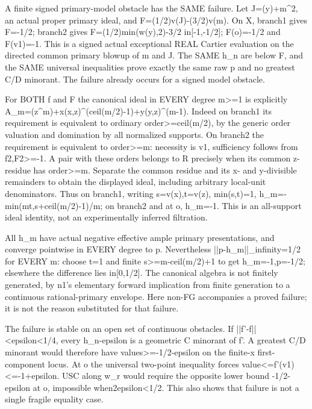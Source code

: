 A finite signed primary-model obstacle has the SAME failure. Let J=(y)+m\textasciicircum{}2, an actual proper primary ideal, and F=(1/2)v(J)-(3/2)v(m). On X, branch1 gives F=-1/2; branch2 gives F=(1/2)min(w(y),2)-3/2 in[-1,-1/2]; F(o)=-1/2 and F(v1)=-1. This is a signed actual exceptional REAL Cartier evaluation on the directed common primary blowup of m and J. The SAME h\_n are below F, and the SAME universal inequalities prove exactly the same raw p and no greatest C/D minorant. The failure already occurs for a signed model obstacle.

For BOTH f and F the canonical ideal in EVERY degree m\textgreater{}=1 is explicitly
A\_m=(z\textasciicircum{}m)+x(x,z)\textasciicircum{}(ceil(m/2)-1)+y(y,z)\textasciicircum{}(m-1).
Indeed on branch1 its requirement is equivalent to ordinary order\textgreater{}=ceil(m/2), by the generic order valuation and domination by all normalized supports. On branch2 the requirement is equivalent to order\textgreater{}=m: necessity is v1, sufficiency follows from f2,F2\textgreater{}=-1. A pair with these orders belongs to R precisely when its common z-residue has order\textgreater{}=m. Separate the common residue and its x- and y-divisible remainders to obtain the displayed ideal, including arbitrary local-unit denominators. Thus on branch1, writing s=v(x),t=v(z), min(s,t)=1,
h\_m=-min(mt,s+ceil(m/2)-1)/m;
on branch2 and at o, h\_m=-1. This is an all-support ideal identity, not an experimentally inferred filtration.

All h\_m have actual negative effective ample primary presentations, and converge pointwise in EVERY degree to p. Nevertheless ||p-h\_m||\_infinity=1/2 for EVERY m: choose t=1 and finite s\textgreater{}=m-ceil(m/2)+1 to get h\_m=-1,p=-1/2; elsewhere the difference lies in[0,1/2]. The canonical algebra is not finitely generated, by n1's elementary forward implication from finite generation to a continuous rational-primary envelope. Here non-FG accompanies a proved failure; it is not the reason substituted for that failure.

The failure is stable on an open set of continuous obstacles. If ||f'-f||\textless{}epsilon\textless{}1/4, every h\_n-epsilon is a geometric C minorant of f'. A greatest C/D minorant would therefore have values\textgreater{}=-1/2-epsilon on the finite-x first-component locus. At o the universal two-point inequality forces value\textless{}=f'(v1)\textless{}=-1+epsilon. USC along w\_r would require the opposite lower bound -1/2-epsilon at o, impossible when2epsilon\textless{}1/2. This also shows that failure is not a single fragile equality case.

